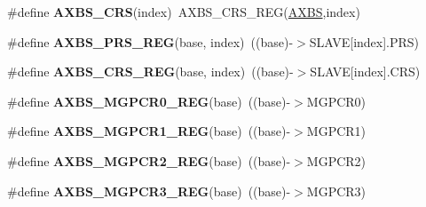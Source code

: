 \begin{DoxyCompactItemize}
\item 
\#define {\bfseries A\+X\+B\+S\+\_\+\+C\+RS}(index)~A\+X\+B\+S\+\_\+\+C\+R\+S\+\_\+\+R\+EG(\hyperlink{group__AXBS__Peripheral__Access__Layer_gaa1f873165d665725d94cd2615e37daf5}{A\+X\+BS},index)\hypertarget{group__AXBS__Register__Accessor__Macros_ga04b2b29af2fc083f1d4b676c1cfebb24}{}\label{group__AXBS__Register__Accessor__Macros_ga04b2b29af2fc083f1d4b676c1cfebb24}

\item 
\#define {\bfseries A\+X\+B\+S\+\_\+\+P\+R\+S\+\_\+\+R\+EG}(base,  index)~((base)-\/$>$S\+L\+A\+VE\mbox{[}index\mbox{]}.P\+RS)\hypertarget{group__AXBS__Register__Accessor__Macros_ga88215ff6f327312c2306aaf23da1ed6d}{}\label{group__AXBS__Register__Accessor__Macros_ga88215ff6f327312c2306aaf23da1ed6d}

\item 
\#define {\bfseries A\+X\+B\+S\+\_\+\+C\+R\+S\+\_\+\+R\+EG}(base,  index)~((base)-\/$>$S\+L\+A\+VE\mbox{[}index\mbox{]}.C\+RS)\hypertarget{group__AXBS__Register__Accessor__Macros_gaa30f55525640429154d1652859524832}{}\label{group__AXBS__Register__Accessor__Macros_gaa30f55525640429154d1652859524832}

\item 
\#define {\bfseries A\+X\+B\+S\+\_\+\+M\+G\+P\+C\+R0\+\_\+\+R\+EG}(base)~((base)-\/$>$M\+G\+P\+C\+R0)\hypertarget{group__AXBS__Register__Accessor__Macros_gac1b692121aae3307439d8a9c9bcfcf0a}{}\label{group__AXBS__Register__Accessor__Macros_gac1b692121aae3307439d8a9c9bcfcf0a}

\item 
\#define {\bfseries A\+X\+B\+S\+\_\+\+M\+G\+P\+C\+R1\+\_\+\+R\+EG}(base)~((base)-\/$>$M\+G\+P\+C\+R1)\hypertarget{group__AXBS__Register__Accessor__Macros_ga76506c532d79ae456a8c7bb93c2aaab5}{}\label{group__AXBS__Register__Accessor__Macros_ga76506c532d79ae456a8c7bb93c2aaab5}

\item 
\#define {\bfseries A\+X\+B\+S\+\_\+\+M\+G\+P\+C\+R2\+\_\+\+R\+EG}(base)~((base)-\/$>$M\+G\+P\+C\+R2)\hypertarget{group__AXBS__Register__Accessor__Macros_ga6aed791b752c5b45919a592387ac8886}{}\label{group__AXBS__Register__Accessor__Macros_ga6aed791b752c5b45919a592387ac8886}

\item 
\#define {\bfseries A\+X\+B\+S\+\_\+\+M\+G\+P\+C\+R3\+\_\+\+R\+EG}(base)~((base)-\/$>$M\+G\+P\+C\+R3)\hypertarget{group__AXBS__Register__Accessor__Macros_ga8fc8df6b6b79bf304bf85ace79194153}{}\label{group__AXBS__Register__Accessor__Macros_ga8fc8df6b6b79bf304bf85ace79194153}


\end{DoxyCompactItemize}
